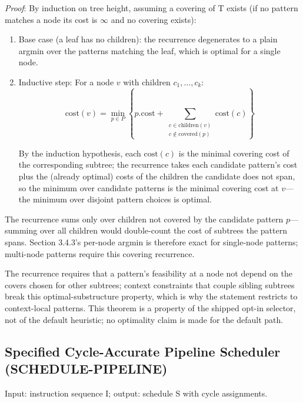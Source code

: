 \documentclass[
  11pt,
]{article}
\begin{document}
\emph{Proof}: By induction on tree height, assuming a covering of T
exists (if no pattern matches a node its cost is \(\infty\) and no
covering exists):

\begin{enumerate}
\def\labelenumi{\arabic{enumi}.}
\item
  Base case (a leaf has no children): the recurrence degenerates to a
  plain argmin over the patterns matching the leaf, which is optimal for
  a single node.
\item
  Inductive step: For a node \(v\) with children \(c_1, \dots, c_k\): \[
  \text{cost}(v) = \min_{p \in P} \left\{p.\text{cost} + \sum_{\substack{c \in \text{children}(v) \\ c \notin \text{covered}(p)}} \text{cost}(c)\right\}
  \]

  By the induction hypothesis, each \(\text{cost}(c)\) is the minimal
  covering cost of the corresponding subtree; the recurrence takes each
  candidate pattern's cost plus the (already optimal) costs of the
  children the candidate does not span, so the minimum over candidate
  patterns is the minimal covering cost at \(v\)---the minimum over
  disjoint pattern choices is optimal.
\end{enumerate}

The recurrence sums only over children not covered by the candidate
pattern \(p\)---summing over all children would double-count the cost of
subtrees the pattern spans. Section 3.4.3's per-node argmin is therefore
exact for single-node patterns; multi-node patterns require this
covering recurrence.

The recurrence requires that a pattern's feasibility at a node not
depend on the covers chosen for other subtrees; context constraints that
couple sibling subtrees break this optimal-substructure property, which
is why the statement restricts to context-local patterns. This theorem
is a property of the shipped opt-in selector, not of the default
heuristic; no optimality claim is made for the default path.

\subsection{Specified Cycle-Accurate Pipeline Scheduler
(SCHEDULE-PIPELINE)}\label{specified-cycle-accurate-pipeline-scheduler-schedule-pipeline}

Input: instruction sequence I; output: schedule S with cycle
assignments.
\end{document}
